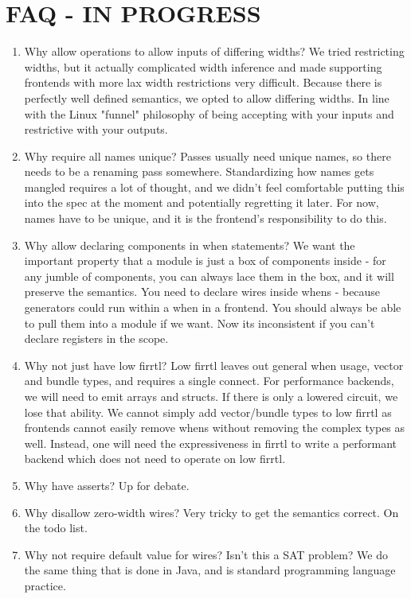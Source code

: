 \documentclass[12pt]{article}
\begin{document}
\section{FAQ - IN PROGRESS}
\begin{enumerate}[topsep=3pt,itemsep=-0.5ex,partopsep=1ex,parsep=1ex]
\item Why allow operations to allow inputs of differing widths? 
We tried restricting widths, but it actually complicated width inference and made supporting frontends with more lax width restrictions very difficult.
Because there is perfectly well defined semantics, we opted to allow differing widths.
In line with the Linux "funnel" philosophy of being accepting with your inputs and restrictive with your outputs.

\item Why require all names unique?
Passes usually need unique names, so there needs to be a renaming pass somewhere.
Standardizing how names gets mangled requires a lot of thought, and we didn't feel comfortable putting this into the spec at the moment and potentially regretting it later.
For now, names have to be unique, and it is the frontend's responsibility to do this.

\item Why allow declaring components in when statements? 
We want the important property that a module is just a box of components inside - for any jumble of components, you can always lace them in the box, and it will preserve the semantics.
You need to declare wires inside whens - because generators could run within a when in a frontend.
You should always be able to pull them into a module if we want.
Now its inconsistent if you can't declare registers in the scope.

\item Why not just have low firrtl?
Low firrtl leaves out general when usage, vector and bundle types, and requires a single connect.
For performance backends, we will need to emit arrays and structs.
If there is only a lowered circuit, we lose that ability.
We cannot simply add vector/bundle types to low firrtl as frontends cannot easily remove whens without removing the complex types as well.
Instead, one will need the expressiveness in firrtl to write a performant backend which does not need to operate on low firrtl.

\item Why have asserts? 
Up for debate.

\item Why disallow zero-width wires? 
Very tricky to get the semantics correct.
On the todo list.

\item Why not require default value for wires? Isn't this a SAT problem?
We do the same thing that is done in Java, and is standard programming language practice.

\end{enumerate}
\end{document}
